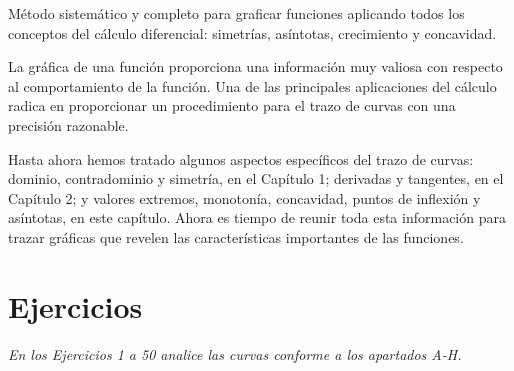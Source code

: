 
Método sistemático y completo para graficar funciones aplicando todos los conceptos del cálculo diferencial: simetrías, asíntotas, crecimiento y concavidad.

La gráfica de una función proporciona una información muy valiosa con respecto al comportamiento de la función. Una de las principales aplicaciones del cálculo radica en proporcionar un procedimiento para el trazo de curvas con una precisión razonable.

Hasta ahora hemos tratado algunos aspectos específicos del trazo de curvas: dominio, contradominio y simetría, en el Capítulo 1; derivadas y tangentes, en el Capítulo 2; y valores extremos, monotonía, concavidad, puntos de inflexión y asíntotas, en este capítulo. Ahora es tiempo de reunir toda esta información para trazar gráficas que revelen las características importantes de las funciones.

\vspace{1.5em}
\section*{Ejercicios}

\noindent \textit{En los Ejercicios 1 a 50 analice las curvas conforme a los apartados A-H.}

